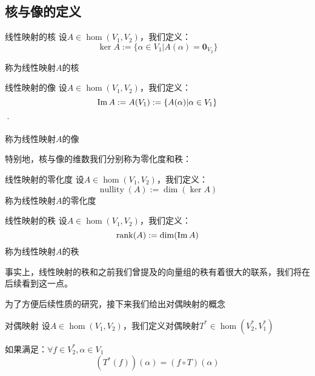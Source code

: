 \documentclass[12pt, a4paper, oneside, UTF8]{ctexbook}
\begin{document}
			\subsection{核与像的定义}
				\begin{defn}{线性映射的核}{}
					设$A \in \hom(V_1,V_2)$，我们定义：
					\begin{equation}
						\ker A := \{\alpha \in V_1 | A(\alpha )=\mathbf{0}_{V_2}\}
					\end{equation}

					称为线性映射$A$的核
				\end{defn}
				\begin{defn}{线性映射的像}{}
					设$A \in \hom(V_1,V_2)$，我们定义：
					\begin{equation}
						\operatorname{Im} A := A(V_1) := \{A(\alpha)| \alpha \in V_1\}
					\end{equation}·

					称为线性映射$A$的像
				\end{defn}
				特别地，核与像的维数我们分别称为零化度和秩：
				\begin{defn}{线性映射的零化度}{}
					设$A \in \hom(V_1,V_2)$，我们定义：
					\begin{equation}
						\operatorname{nullity} (A) := \dim(\ker A)
					\end{equation}
					称为线性映射$A$的零化度
				\end{defn}
				\begin{defn}{线性映射的秩}{}
					设$A \in \hom(V_1,V_2)$，我们定义：
					\begin{equation}
						\operatorname{rank} (A) := \dim(\operatorname{Im} A)
					\end{equation}
					称为线性映射$A$的秩
				\end{defn}
				事实上，线性映射的秩和之前我们曾提及的向量组的秩有着很大的联系，我们将在后续看到这一点。

				为了方便后续性质的研究，接下来我们给出对偶映射的概念
				\begin{defn}{对偶映射}{}
					设$A \in \hom(V_1,V_2)$，我们定义对偶映射$T^* \in \hom (V_2^*,V_1^*)$

					如果满足：$\forall f \in V_2^*,\alpha \in V_1$
					\begin{equation}
							\left(T^*(f)\right)(\alpha )=(f\circ T)(\alpha )
					\end{equation}
				\end{defn}
\end{document}
